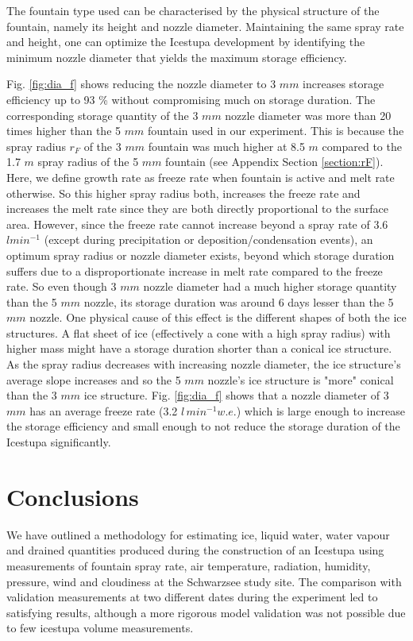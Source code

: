\documentclass[utf8]{frontiersSCNS} %
\begin{document}
The fountain type used can be characterised by the physical structure of the fountain, namely its height and nozzle
diameter. Maintaining the same spray rate and height, one can optimize the Icestupa development by identifying the
minimum nozzle diameter that yields the maximum storage efficiency. 

Fig. \ref{fig:dia_f} shows reducing the nozzle diameter to 3 $mm$ increases storage efficiency up to 93 \% without
compromising much on storage duration.  The corresponding storage quantity of the 3 $mm$ nozzle diameter was more than
20 times higher than the 5 $mm$ fountain used in our experiment. This is because the spray radius $r_F$ of the 3 $mm$
fountain was much higher at 8.5 $m$ compared to the 1.7 $m$ spray radius of the 5 $mm$ fountain (see Appendix Section
\ref{section:rF}). Here, we define growth rate as freeze rate when fountain is active and melt rate otherwise. So this
higher spray radius both, increases the freeze rate  and increases the melt rate since they are both directly
proportional to the surface area. However, since the freeze rate cannot increase beyond a spray rate of 3.6 $l
min^{-1}$ (except during precipitation or deposition/condensation events), an optimum spray radius or nozzle diameter
exists, beyond which storage duration suffers due to a disproportionate increase in melt rate compared to the freeze
rate. So even though 3 $mm$ nozzle diameter had a much higher storage quantity than the 5 $mm$ nozzle, its storage
duration was around 6 days lesser than the 5 $mm$ nozzle. One physical cause of this effect is the different shapes of
both the ice structures. A flat sheet of ice (effectively a cone with a high spray radius) with higher mass might have
a storage duration shorter than a conical ice structure. As the spray radius decreases with increasing nozzle
diameter, the ice structure’s average slope increases and so the 5 $mm$ nozzle's ice structure is "more" conical than
the 3 $mm$ ice structure. Fig.  \ref{fig:dia_f} shows that a nozzle diameter of 3 $mm$ has an average freeze rate (3.2
$l \,min^{-1} w.e.$) which is large enough to increase the storage efficiency and small enough to not reduce the
storage duration of the Icestupa significantly.

\section{Conclusions} We have outlined a methodology for estimating ice, liquid water, water vapour and drained
quantities produced during the construction of an Icestupa using measurements of fountain spray rate, air temperature,
radiation, humidity, pressure, wind and cloudiness at the Schwarzsee study site. The comparison with validation
measurements at two different dates during the experiment led to satisfying results, although a more rigorous model
validation was not possible due to few icestupa volume measurements.
\end{document}
